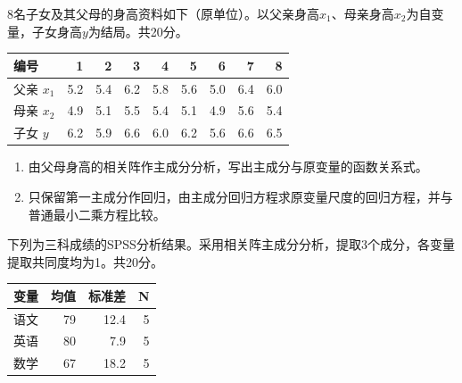 \par\addvspace{6pt}\noindent\begin{minipage}{\linewidth}


8名子女及其父母的身高资料如下（原单位）。以父亲身高\(x_1\)、母亲身高\(x_2\)为自变量，子女身高\(y\)为结局。共20分。

\begin{center}\small\setlength{\tabcolsep}{5pt}\renewcommand{\arraystretch}{1.18}\begin{tabular}{@{}lrrrrrrrr@{}}
\toprule
编号 & 1 & 2 & 3 & 4 & 5 & 6 & 7 & 8 \\
\midrule
父亲 \(x_1\) & 5.2 & 5.4 & 6.2 & 5.8 & 5.6 & 5.0 & 6.4 & 6.0 \\
母亲 \(x_2\) & 4.9 & 5.1 & 5.5 & 5.4 & 5.1 & 4.9 & 5.6 & 5.4 \\
子女 \(y\) & 6.2 & 5.9 & 6.6 & 6.0 & 6.2 & 5.6 & 6.6 & 6.5 \\
\bottomrule\end{tabular}\end{center}

\begin{enumerate}
\def\labelenumi{\arabic{enumi}.}
\tightlist
\item
  由父母身高的相关阵作主成分分析，写出主成分与原变量的函数关系式。
\item
  只保留第一主成分作回归，由主成分回归方程求原变量尺度的回归方程，并与普通最小二乘方程比较。
\end{enumerate}


\end{minipage}\par\vspace{4pt}


下列为三科成绩的SPSS分析结果。采用相关阵主成分分析，提取3个成分，各变量提取共同度均为1。共20分。

\begin{center}\small\setlength{\tabcolsep}{4pt}\renewcommand{\arraystretch}{1.18}\begin{tabular}{@{}lrrr@{}}
\toprule
变量 & 均值 & 标准差 & N \\
\midrule

语文 & 79 & 12.4 & 5 \\
英语 & 80 & 7.9 & 5 \\
数学 & 67 & 18.2 & 5 \\
\bottomrule\end{tabular}\end{center}

